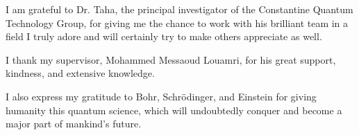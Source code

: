 I am grateful to Dr. Taha, the principal investigator of the Constantine Quantum Technology Group, for giving me the chance to work with his brilliant team in a field I truly adore and will certainly try to make others appreciate as well.

I thank my supervisor, Mohammed Messaoud Louamri, for his great support, kindness, and extensive knowledge.

I also express my gratitude to Bohr, Schrödinger, and Einstein for giving humanity this quantum science, which will undoubtedly conquer and become a major part of mankind's future.
